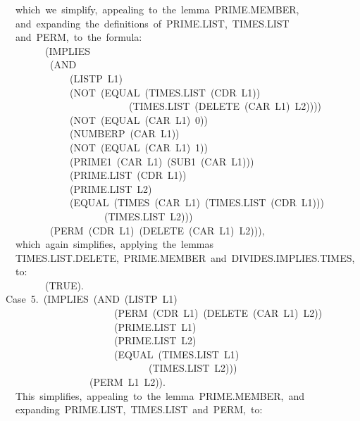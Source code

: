 \documentclass[11pt]{book}
\newenvironment{pubasis}{\begin{flushleft}\ttfamily\small}{\normalsize\rmfamily\end{flushleft}}
\begin{document}
\begin{pubasis}
~~which~we~simplify,~appealing~to~the~lemma~PRIME.MEMBER,\\
~~and~expanding~the~definitions~of~PRIME.LIST,~TIMES.LIST\\
~~and~PERM,~to~the~formula:\\

~~~~~~~~(IMPLIES\\
~~~~~~~~~(AND\\
~~~~~~~~~~~~~(LISTP~L1)\\
~~~~~~~~~~~~~(NOT~(EQUAL~(TIMES.LIST~(CDR~L1))\\
~~~~~~~~~~~~~~~~~~~~~~~~~(TIMES.LIST~(DELETE~(CAR~L1)~L2))))\\
~~~~~~~~~~~~~(NOT~(EQUAL~(CAR~L1)~0))\\
~~~~~~~~~~~~~(NUMBERP~(CAR~L1))\\
~~~~~~~~~~~~~(NOT~(EQUAL~(CAR~L1)~1))\\
~~~~~~~~~~~~~(PRIME1~(CAR~L1)~(SUB1~(CAR~L1)))\\
~~~~~~~~~~~~~(PRIME.LIST~(CDR~L1))\\
~~~~~~~~~~~~~(PRIME.LIST~L2)\\
~~~~~~~~~~~~~(EQUAL~(TIMES~(CAR~L1)~(TIMES.LIST~(CDR~L1)))\\
~~~~~~~~~~~~~~~~~~~~(TIMES.LIST~L2)))\\
~~~~~~~~~(PERM~(CDR~L1)~(DELETE~(CAR~L1)~L2))),\\

~~which~again~simplifies,~applying~the~lemmas\\
~~TIMES.LIST.DELETE,~PRIME.MEMBER~and~DIVIDES.IMPLIES.TIMES,\\
~~to:\\

~~~~~~~~(TRUE).\\

Case~5.~(IMPLIES~(AND~(LISTP~L1)\\
~~~~~~~~~~~~~~~~~~~~~~(PERM~(CDR~L1)~(DELETE~(CAR~L1)~L2))\\
~~~~~~~~~~~~~~~~~~~~~~(PRIME.LIST~L1)\\
~~~~~~~~~~~~~~~~~~~~~~(PRIME.LIST~L2)\\
~~~~~~~~~~~~~~~~~~~~~~(EQUAL~(TIMES.LIST~L1)\\
~~~~~~~~~~~~~~~~~~~~~~~~~~~~~(TIMES.LIST~L2)))\\
~~~~~~~~~~~~~~~~~(PERM~L1~L2)).\\

~~This~simplifies,~appealing~to~the~lemma~PRIME.MEMBER,~and\\
~~expanding~PRIME.LIST,~TIMES.LIST~and~PERM,~to:\\


\end{pubasis}
\end{document}
